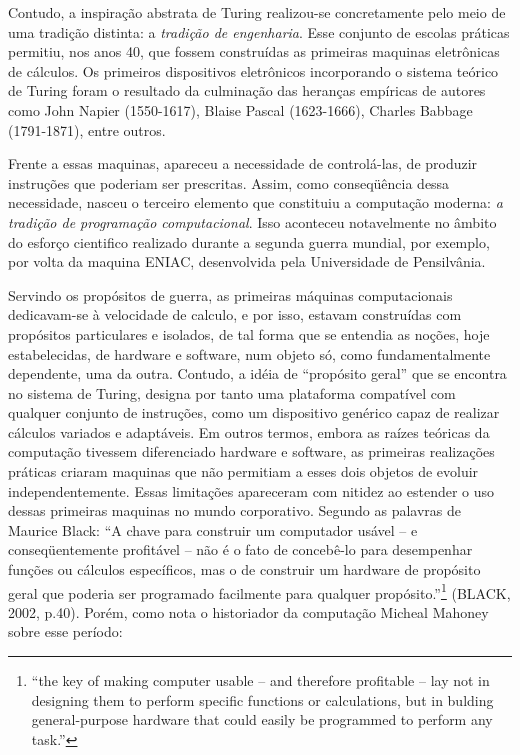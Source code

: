 Contudo, a inspiração abstrata de Turing realizou-se concretamente pelo meio de uma tradição distinta: a \emph{tradição de engenharia}. Esse conjunto de escolas práticas permitiu, nos anos 40, que fossem construídas as primeiras maquinas eletrônicas de cálculos. Os primeiros dispositivos eletrônicos incorporando o sistema teórico de Turing foram o resultado da culminação das heranças empíricas de autores como John Napier (1550-1617), Blaise Pascal (1623-1666), Charles Babbage (1791-1871), entre outros.

Frente a essas maquinas, apareceu a necessidade de controlá-las, de produzir instruções que poderiam ser prescritas. Assim, como conseqüência dessa necessidade, nasceu o terceiro elemento que constituiu a computação moderna: \emph{a tradição de programação computacional}. Isso aconteceu notavelmente no âmbito do esforço cientifico realizado durante a segunda guerra mundial, por exemplo, por volta da maquina ENIAC, desenvolvida pela Universidade de Pensilvânia.

Servindo os propósitos de guerra, as primeiras máquinas computacionais dedicavam-se à velocidade de calculo, e por isso, estavam construídas com propósitos particulares e isolados, de tal forma que se entendia as noções, hoje estabelecidas, de hardware e software, num objeto só, como fundamentalmente dependente, uma da outra. Contudo, a idéia de “propósito geral” que se encontra no sistema de Turing, designa por tanto uma plataforma compatível com qualquer conjunto de instruções, como um dispositivo genérico capaz de realizar cálculos variados e adaptáveis. Em outros termos, embora as raízes teóricas da computação tivessem diferenciado hardware e software, as primeiras realizações práticas criaram maquinas que não permitiam a esses dois objetos de evoluir independentemente. Essas limitações apareceram com nitidez ao estender o uso dessas primeiras maquinas no mundo corporativo. Segundo as palavras de Maurice Black: “A chave para construir um computador usável – e conseqüentemente profitável – não é o fato de concebê-lo para desempenhar funções ou cálculos específicos, mas o de construir um hardware de propósito geral que poderia ser programado facilmente para qualquer propósito.”\footnote{“the key of making computer usable – and therefore profitable – lay not in designing them to perform specific functions or calculations, but in bulding general-purpose hardware that could easily be programmed to perform any task.”} (BLACK, 2002, p.40). Porém, como nota o historiador da computação Micheal Mahoney sobre esse período: 

